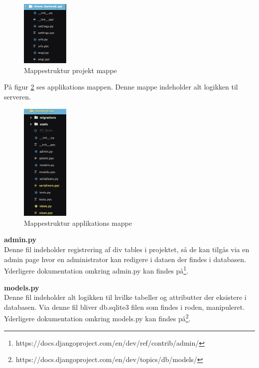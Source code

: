 \begin{figure}[H]
	\centering
	\includegraphics[width=0.2\textwidth]{Billeder/implementation/mappestruktur_2.png}
	\caption{Mappestruktur projekt mappe}
	\label{fig:mappestruktur_2}
\end{figure}

\newpage

På figur \ref{fig:mappestruktur_3} ses applikations mappen. Denne mappe indeholder alt logikken til serveren.

\begin{figure}[H]
	\centering
	\includegraphics[width=0.2\textwidth]{Billeder/implementation/mappestruktur_3.png}
	\caption{Mappestruktur applikations mappe}
	\label{fig:mappestruktur_3}
\end{figure}

\textbf{admin.py} \\
Denne fil indeholder registrering af div tables i projektet, så de kan tilgås via en admin page hvor en administrator kan redigere i dataen der findes i databasen. Yderligere dokumentation omkring admin.py kan findes på\footnote{https://docs.djangoproject.com/en/dev/ref/contrib/admin/}.

\textbf{models.py} \\
Denne fil indeholder alt logikken til hvilke tabeller og attributter der eksistere i databasen. Via denne fil bliver db.sqlite3 filen som findes i roden, manipuleret. Yderligere dokumentation omkring models.py kan findes på\footnote{https://docs.djangoproject.com/en/dev/topics/db/models/}.

